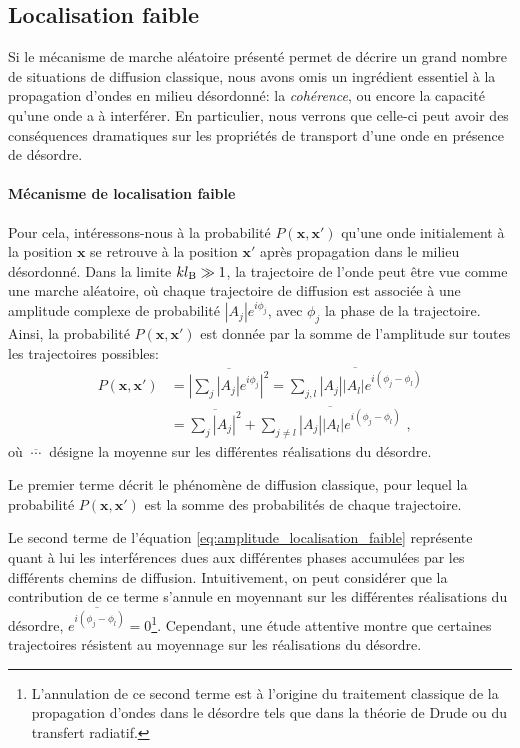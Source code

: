 \subsection{Localisation faible}
\label{sc:weak_localisation}
Si le mécanisme de marche aléatoire présenté permet de décrire un grand nombre de situations de diffusion classique, nous avons omis un ingrédient essentiel à la propagation d'ondes en milieu désordonné: la \emph{cohérence}, ou encore la capacité qu'une onde a à interférer. En particulier, nous verrons que celle-ci peut avoir des conséquences dramatiques sur les propriétés de transport d'une onde en présence de désordre.

\paragraph*{Mécanisme de localisation faible}
Pour cela, intéressons-nous à la probabilité $P(\mathbf{x},\mathbf{x}')$ qu'une onde initialement à la position $\mathbf{x}$ se retrouve à la position $\mathbf{x}'$ après propagation dans le milieu désordonné. Dans la limite $kl_{\mathrm{B}}\gg 1$, la trajectoire de l'onde peut être vue comme une marche aléatoire, où chaque trajectoire de diffusion est associée à une amplitude complexe de probabilité $\left| A_j \right| e^{i \phi_j}$, avec $\phi_j$ la phase de la trajectoire. Ainsi, la probabilité $P(\mathbf{x},\mathbf{x}')$ est donnée par la somme de l'amplitude sur toutes les trajectoires possibles:
\begin{align}
P(\mathbf{x},\mathbf{x}') \nonumber&= \overline{{\left| \sum_j{ \left|A_j\right| e^{i \phi_j} }\right| }^2} = \overline{\sum_{j,l} {\left| A_j \right| \left| A_l \right| e^{i (\phi_j - \phi_l)}}} \\
&= \overline{\sum_j{{\left| A_j \right|}^2}} + \overline{\sum_{j\neq l}{\left| A_j \right| \left|A_l \right| e^{i(\phi_j - \phi_l)}}} \text{ ,}
\label{eq:amplitude_localisation_faible}
\end{align}
où $\overline{\:\cdots\:}$ désigne la moyenne sur les différentes réalisations du désordre.

Le premier terme décrit le phénomène de diffusion classique, pour lequel la probabilité $P(\mathbf{x},\mathbf{x}')$ est la somme des probabilités de chaque trajectoire. 

Le second terme de l'équation \ref{eq:amplitude_localisation_faible} représente quant à lui les interférences dues aux différentes phases accumulées par les différents chemins de diffusion. Intuitivement, on peut considérer que la contribution de ce terme s'annule en moyennant sur les différentes réalisations du désordre, $\overline{e^{i(\phi_j - \phi_l)}}=0$\footnote{L'annulation de ce second terme est à l'origine du traitement classique de la propagation d'ondes dans le désordre tels que dans la théorie de Drude ou du transfert radiatif.}. Cependant, une étude attentive montre que certaines trajectoires résistent au moyennage sur les réalisations du désordre.

